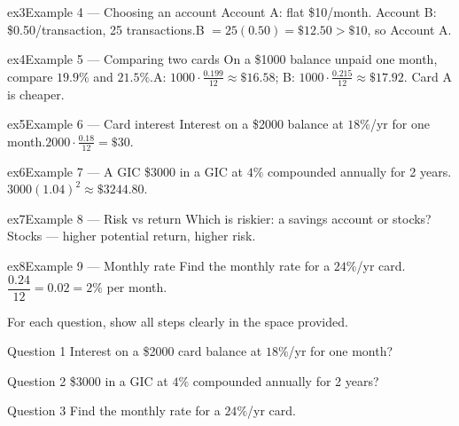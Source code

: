 \documentclass[11pt]{article}
\begin{document}
\begin{example}{ex3}{Example 4 --- Choosing an account}
Account A: flat \$10/month. Account B: \$0.50/transaction, 25 transactions.\soln B $=25(0.50)=\$12.50>\$10$, so Account A.
\end{example}

\begin{example}{ex4}{Example 5 --- Comparing two cards}
On a \$1000 balance unpaid one month, compare $19.9\%$ and $21.5\%$.\soln A: $1000\cdot\tfrac{0.199}{12}\approx\$16.58$; B: $1000\cdot\tfrac{0.215}{12}\approx\$17.92$. Card A is cheaper.
\end{example}

\begin{example}{ex5}{Example 6 --- Card interest}
Interest on a \$2000 balance at $18\%$/yr for one month.\soln $2000\cdot\tfrac{0.18}{12}=\$30$.
\end{example}

\begin{example}{ex6}{Example 7 --- A GIC}
\$3000 in a GIC at $4\%$ compounded annually for 2 years.\soln $3000(1.04)^2\approx\$3244.80$.
\end{example}

\begin{example}{ex7}{Example 8 --- Risk vs return}
Which is riskier: a savings account or stocks?\soln Stocks — higher potential return, higher risk.
\end{example}

\begin{example}{ex8}{Example 9 --- Monthly rate}
Find the monthly rate for a $24\%$/yr card.\soln $\dfrac{0.24}{12}=0.02=2\%$ per month.
\end{example}

\clearpage
{}
For each question, show all steps clearly in the space provided.

\begin{qbox}{Question 1}
Interest on a \$2000 card balance at $18\%$/yr for one month?\workspace{2.4cm}
\end{qbox}

\begin{qbox}{Question 2}
\$3000 in a GIC at $4\%$ compounded annually for 2 years?\workspace{2.4cm}
\end{qbox}

\begin{qbox}{Question 3}
Find the monthly rate for a $24\%$/yr card.\workspace{2.4cm}
\end{qbox}
\end{document}

